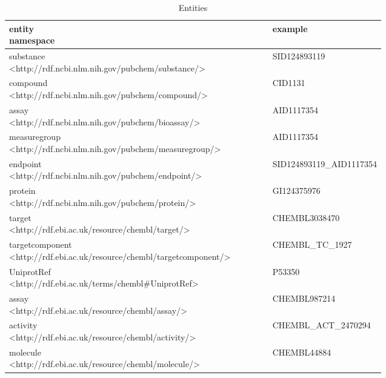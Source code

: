 \begin{table}[]
\caption{Entities}
\label{tab:opddr_02}
\centering
\begin{tabular}{p{0.7\linewidth}p{0.3\linewidth}}
\hline
\makecell[l]{\textbf{entity} \\ namespace} & \textbf{example} \\
\hline
\makecell[l]{substance \\ \textless http://rdf.ncbi.nlm.nih.gov/pubchem/substance/\textgreater} & SID124893119 \\
\makecell[l]{compound \\ \textless http://rdf.ncbi.nlm.nih.gov/pubchem/compound/\textgreater} & CID1131 \\
\makecell[l]{assay \\ \textless http://rdf.ncbi.nlm.nih.gov/pubchem/bioassay/\textgreater} & AID1117354 \\
\makecell[l]{measuregroup \\ \textless http://rdf.ncbi.nlm.nih.gov/pubchem/measuregroup/\textgreater} & AID1117354 \\
\makecell[l]{endpoint \\ \textless http://rdf.ncbi.nlm.nih.gov/pubchem/endpoint/\textgreater} & SID124893119\_AID1117354 \\
\makecell[l]{protein \\ \textless http://rdf.ncbi.nlm.nih.gov/pubchem/protein/\textgreater} & GI124375976 \\
\makecell[l]{target \\ \textless http://rdf.ebi.ac.uk/resource/chembl/target/\textgreater} & CHEMBL3038470 \\
\makecell[l]{targetcomponent \\ \textless http://rdf.ebi.ac.uk/resource/chembl/targetcomponent/\textgreater} & CHEMBL\_TC\_1927 \\
\makecell[l]{UniprotRef \\ \textless http://rdf.ebi.ac.uk/terms/chembl\#UniprotRef\textgreater} & P53350 \\
\makecell[l]{assay \\ \textless http://rdf.ebi.ac.uk/resource/chembl/assay/\textgreater} & CHEMBL987214 \\
\makecell[l]{activity \\ \textless http://rdf.ebi.ac.uk/resource/chembl/activity/\textgreater} & CHEMBL\_ACT\_2470294 \\
\makecell[l]{molecule \\ \textless http://rdf.ebi.ac.uk/resource/chembl/molecule/\textgreater} & CHEMBL44884 \\
\hline
\end{tabular}
\end{table}

